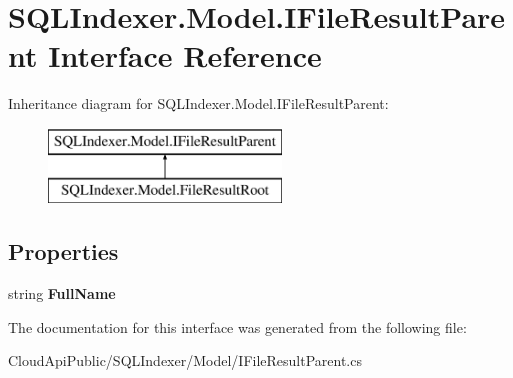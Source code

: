 \hypertarget{interface_s_q_l_indexer_1_1_model_1_1_i_file_result_parent}{\section{S\-Q\-L\-Indexer.\-Model.\-I\-File\-Result\-Parent Interface Reference}
\label{interface_s_q_l_indexer_1_1_model_1_1_i_file_result_parent}
}
Inheritance diagram for S\-Q\-L\-Indexer.\-Model.\-I\-File\-Result\-Parent\-:\begin{figure}[H]
\begin{center}
\leavevmode
\includegraphics[height=2.000000cm]{interface_s_q_l_indexer_1_1_model_1_1_i_file_result_parent}
\end{center}
\end{figure}
\subsection*{Properties}
\begin{DoxyCompactItemize}
\item 
\hypertarget{interface_s_q_l_indexer_1_1_model_1_1_i_file_result_parent_a6b9a29523badc29a197b0a510e4b191c}{string {\bfseries Full\-Name}}\label{interface_s_q_l_indexer_1_1_model_1_1_i_file_result_parent_a6b9a29523badc29a197b0a510e4b191c}

\end{DoxyCompactItemize}


The documentation for this interface was generated from the following file\-:\begin{DoxyCompactItemize}
\item 
Cloud\-Api\-Public/\-S\-Q\-L\-Indexer/\-Model/I\-File\-Result\-Parent.\-cs\end{DoxyCompactItemize}
